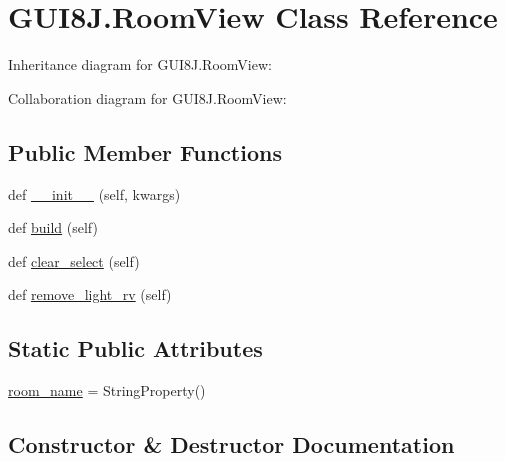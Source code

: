 \hypertarget{classGUI8J_1_1RoomView}{}\section{G\+U\+I8\+J.\+Room\+View Class Reference}
\label{classGUI8J_1_1RoomView}


Inheritance diagram for G\+U\+I8\+J.\+Room\+View\+:


Collaboration diagram for G\+U\+I8\+J.\+Room\+View\+:
\subsection*{Public Member Functions}
\begin{DoxyCompactItemize}
\item 
def \hyperlink{classGUI8J_1_1RoomView_abdd1610222b7965da88ea0fb392a07c2}{\+\_\+\+\_\+init\+\_\+\+\_\+} (self, kwargs)
\item 
def \hyperlink{classGUI8J_1_1RoomView_a3c3f1fc067fd2ebed632e1b67c530962}{build} (self)
\item 
def \hyperlink{classGUI8J_1_1RoomView_a9891bdfcea5d6160d32fdb85aecf4091}{clear\+\_\+select} (self)
\item 
def \hyperlink{classGUI8J_1_1RoomView_a494cf304473168ccc8c02bf21db720e3}{remove\+\_\+light\+\_\+rv} (self)
\end{DoxyCompactItemize}
\subsection*{Static Public Attributes}
\begin{DoxyCompactItemize}
\item 
\hyperlink{classGUI8J_1_1RoomView_a08f244cc3d025a53e8b638c3916189e9}{room\+\_\+name} = String\+Property()
\end{DoxyCompactItemize}


\subsection{Constructor \& Destructor Documentation}
\mbox{\label{classGUI8J_1_1RoomView_abdd1610222b7965da88ea0fb392a07c2}} 
